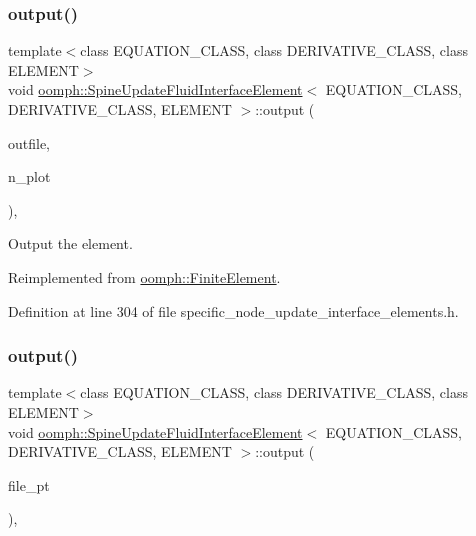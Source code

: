 \subsubsection{\texorpdfstring{output()}{output()}\hspace{0.1cm}{\footnotesize\ttfamily [2/4]}}
{\footnotesize\ttfamily template$<$class E\+Q\+U\+A\+T\+I\+O\+N\+\_\+\+C\+L\+A\+SS, class D\+E\+R\+I\+V\+A\+T\+I\+V\+E\+\_\+\+C\+L\+A\+SS, class E\+L\+E\+M\+E\+NT$>$ \\
void \hyperlink{classoomph_1_1SpineUpdateFluidInterfaceElement}{oomph\+::\+Spine\+Update\+Fluid\+Interface\+Element}$<$ E\+Q\+U\+A\+T\+I\+O\+N\+\_\+\+C\+L\+A\+SS, D\+E\+R\+I\+V\+A\+T\+I\+V\+E\+\_\+\+C\+L\+A\+SS, E\+L\+E\+M\+E\+NT $>$\+::output (\begin{DoxyParamCaption}\item[{std\+::ostream \&}]{outfile,  }\item[{const unsigned \&}]{n\+\_\+plot }\end{DoxyParamCaption})\hspace{0.3cm}{\ttfamily [inline]}, {\ttfamily [virtual]}}



Output the element. 



Reimplemented from \hyperlink{classoomph_1_1FiniteElement_afa9d9b2670f999b43e6679c9dd28c457}{oomph\+::\+Finite\+Element}.



Definition at line 304 of file specific\+\_\+node\+\_\+update\+\_\+interface\+\_\+elements.\+h.

\mbox{\label{classoomph_1_1SpineUpdateFluidInterfaceElement_a963fdd8b603e563da9fb966e0c429457}} 
\subsubsection{\texorpdfstring{output()}{output()}\hspace{0.1cm}{\footnotesize\ttfamily [3/4]}}
{\footnotesize\ttfamily template$<$class E\+Q\+U\+A\+T\+I\+O\+N\+\_\+\+C\+L\+A\+SS, class D\+E\+R\+I\+V\+A\+T\+I\+V\+E\+\_\+\+C\+L\+A\+SS, class E\+L\+E\+M\+E\+NT$>$ \\
void \hyperlink{classoomph_1_1SpineUpdateFluidInterfaceElement}{oomph\+::\+Spine\+Update\+Fluid\+Interface\+Element}$<$ E\+Q\+U\+A\+T\+I\+O\+N\+\_\+\+C\+L\+A\+SS, D\+E\+R\+I\+V\+A\+T\+I\+V\+E\+\_\+\+C\+L\+A\+SS, E\+L\+E\+M\+E\+NT $>$\+::output (\begin{DoxyParamCaption}\item[{F\+I\+LE $\ast$}]{file\+\_\+pt }\end{DoxyParamCaption})\hspace{0.3cm}{\ttfamily [inline]}, {\ttfamily [virtual]}}



